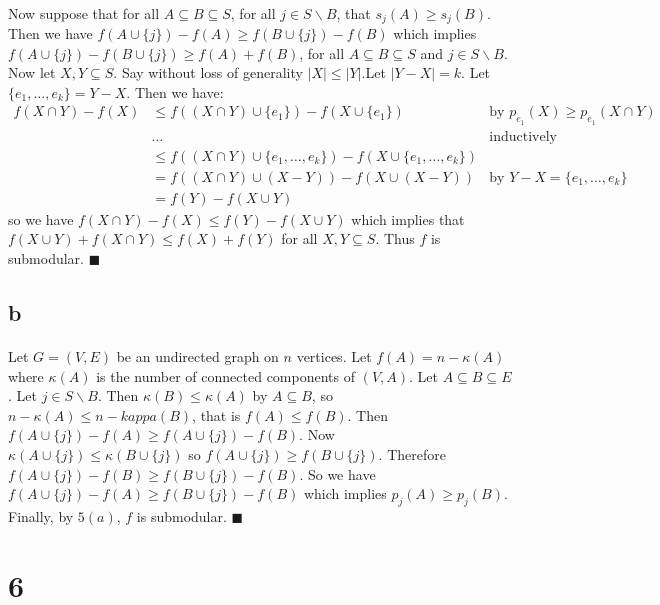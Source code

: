 \documentclass[letterpaper,12pt,oneside,onecolumn]{report}
\begin{document}
\paragraph{}
Now suppose that for all $A \subseteq B \subseteq S$, for all $j \in S \backslash B$, that $s_j(A) \geq s_j(B)$. Then we have $f(A \cup \{j\}) - f(A) \geq f(B \cup \{j\}) - f(B)$ which implies $f(A \cup \{j\}) - f(B \cup \{j\}) \geq f(A) + f(B)$, for all $A \subseteq B \subseteq S$ and $j \in S \backslash B$. Now let $X, Y \subseteq S$. Say without loss of generality $|X| \leq |Y|$.Let $|Y - X| = k$. Let $\{e_1, \dots, e_k\} = Y-X$. Then we have:
\begin{align*}
f(X \cap Y) - f(X) &\leq f((X \cap Y) \cup \{e_1\}) - f(X \cup \{e_1\}) &\text{by $p_{e_1}(X) \geq p_{e_1}(X\cap Y)$} \\
& \dots &\text{inductively} \\
&\leq f((X\cap Y) \cup \{e_1, \dots, e_k\}) - f(X \cup \{e_1, \dots, e_k\}) \\
&= f((X \cap Y) \cup (X - Y)) - f(X \cup (X - Y))  &\text{by $Y-X = \{e_1, \dots, e_k\}$}\\
&= f(Y) - f(X \cup Y)
\end{align*}  
so we have $f(X \cap Y) - f(X) \leq f(Y) - f(X \cup Y)$ which implies that $f(X \cup Y) + f(X \cap Y) \leq f(X) + f(Y)$ for all $X,Y \subseteq S$. Thus $f$ is submodular. $\blacksquare$
\subsection*{b}
\paragraph{}
Let $G = (V,E)$ be an undirected graph on $n$ vertices. Let $f(A) = n - \kappa(A)$ where $\kappa(A)$ is the number of connected components of $(V,A)$. Let $A \subseteq B \subseteq E$. Let $j \in S \backslash B$. Then $\kappa(B) \leq \kappa(A)$ by $A \subseteq B$, so $n - \kappa(A) \leq n - kappa(B)$, that is $f(A) \leq f(B)$. Then $f(A \cup \{j\}) - f(A) \geq f(A \cup \{j\}) - f(B)$. Now $\kappa(A \cup \{j\}) \leq \kappa(B \cup \{j\})$ so $f(A\cup \{j\}) \geq f(B \cup \{j\})$. Therefore $f(A \cup \{j\}) - f(B) \geq f(B \cup \{j\}) - f(B)$. So we have $f(A \cup \{j\}) - f(A) \geq f(B \cup \{j\}) - f(B)$ which implies $p_j(A) \geq p_j(B)$. Finally, by $5(a)$, $f$ is submodular. $\blacksquare$ 
\section*{6}
\end{document}
